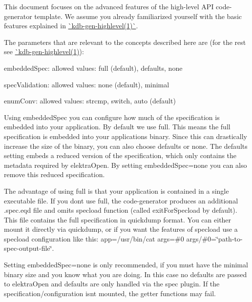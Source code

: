 This document focuses on the advanced features of the high-\/level A\+PI code-\/generator template. We assume you already familiarized yourself with the basic features explained in \mbox{\hyperlink{doc_help_kdb-gen-highlevel_md}{\`{}kdb-\/gen-\/highlevel(1)\`{}}}.

The parameters that are relevant to the concepts described here are (for the rest see \mbox{\hyperlink{doc_help_kdb-gen-highlevel_md}{\`{}kdb-\/gen-\/highlevel(1)}})\+:


\begin{DoxyItemize}
\item {\ttfamily embedded\+Spec}\+: allowed values\+: {\ttfamily full} (default), {\ttfamily defaults}, {\ttfamily none}
\item {\ttfamily spec\+Validation}\+: allowed values\+: {\ttfamily none} (default), {\ttfamily minimal}
\item {\ttfamily enum\+Conv}\+: allowed values\+: {\ttfamily strcmp}, {\ttfamily switch}, {\ttfamily auto} (default)
\end{DoxyItemize}

Using {\ttfamily embedded\+Spec} you can configure how much of the specification is embedded into your application. By default we use {\ttfamily full}. This means the full specification is embedded into your application\textquotesingle{}s binary. Since this can drastically increase the size of the binary, you can also choose {\ttfamily defaults} or {\ttfamily none}. The {\ttfamily defaults} setting embeds a reduced version of the specification, which only contains the metadata required by {\ttfamily elektra\+Open}. By setting {\ttfamily embedded\+Spec=none} you can also remove this reduced specification.

The advantage of using {\ttfamily full} is that your application is contained in a single executable file. If you don\textquotesingle{}t use {\ttfamily full}, the code-\/generator produces an additional {\ttfamily .spec.\+eqd} file and omits specload function (called {\ttfamily exit\+For\+Specload} by default). This file contains the full specification in quickdump format. You can either mount it directly via {\ttfamily quickdump}, or if you want the features of {\ttfamily specload} use a {\ttfamily specload} configuration like this\+: {\ttfamily app=/usr/bin/cat args=\#0 args/\#0=\char`\"{}path-\/to-\/spec-\/output-\/file\char`\"{}}.

Setting {\ttfamily embedded\+Spec=none} is only recommended, if you must have the minimal binary size and you know what you are doing. In this case no defaults are passed to {\ttfamily elektra\+Open} and defaults are only handled via the {\ttfamily spec} plugin. If the specification/configuration isn\textquotesingle{}t mounted, the getter functions may fail.


